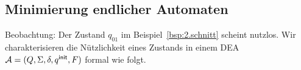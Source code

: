 \goodbreak





\subsection{Minimierung endlicher Automaten}

% 
% 

Beobachtung: Der Zustand $q_{01}$ im Beispiel~\ref{bsp:2.schnitt}
scheint nutzlos. Wir charakterisieren die Nützlichkeit eines Zustands
in einem DEA $\mathcal{A} = (Q, \Sigma, \delta, q^\mathsf{init}, F)$ formal wie folgt.

